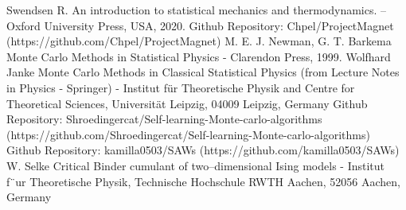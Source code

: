 \begin{thebibliography}{9}
 Swendsen R. An introduction to statistical mechanics and thermodynamics. – Oxford University Press, USA, 2020.
 Github Repository: Chpel/ProjectMagnet (https://github.com/Chpel/ProjectMagnet)
 M. E. J. Newman, G. T. Barkema Monte Carlo Methods in Statistical Physics - Clarendon Press, 1999.
 Wolfhard Janke Monte Carlo Methods in Classical Statistical Physics (from Lecture Notes in Physics - Springer) - Institut für Theoretische Physik and Centre for Theoretical Sciences, Universität Leipzig, 04009 Leipzig, Germany
 Github Repository: Shroedingercat/Self-learning-Monte-carlo-algorithms (https://github.com/Shroedingercat/Self-learning-Monte-carlo-algorithms)
 Github Repository: kamilla0503/SAWs (https://github.com/kamilla0503/SAWs)
 W. Selke Critical Binder cumulant of two–dimensional Ising models - Institut f¨ur Theoretische Physik, Technische Hochschule RWTH Aachen, 52056 Aachen, Germany
\end{thebibliography}
